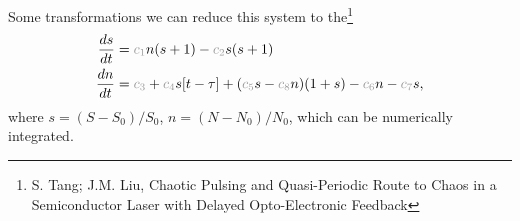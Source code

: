\newcommand{\grey}[1]{\textcolor{mygray}{#1}}

Some transformations we can reduce this system to the\footnote{
S. Tang; J.M. Liu,
 Chaotic Pulsing and Quasi-Periodic Route to Chaos in a Semiconductor Laser with Delayed Opto-Electronic Feedback    
}
\begin{align*}
    \frac{d s}{d t} &= \grey{c_1} n (s+1) - \grey{c_2} s (s+1) \\
    \frac{d n}{d t} &= \grey{c_3} + \grey{c_4}  s[t-\tau] + (\grey{c_5} s -\grey{c_8} n) (1+s) - \grey{c_6} n - \grey{c_7} s ,
\end{align*}
where $s = (S-S_0)/S_0$, $n = (N-N_0)/N_0$, which can be numerically integrated.